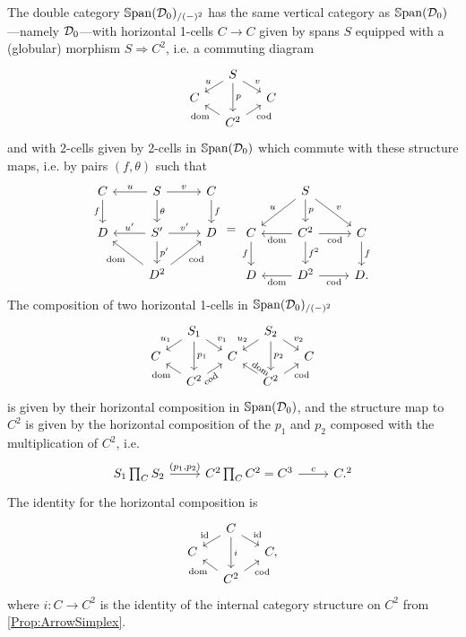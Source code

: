 The double category $\mathbb{S}\mathrm{pan}(\mathcal{D}_0)_{/(-)^2}$ has the same vertical category as $\mathbb{S}\mathrm{pan}(\mathcal{D}_0)$---namely $\mathcal{D}_0$---with horizontal 1-cells $C\to C$ given by spans $S$ equipped with a (globular) morphism $S\Rightarrow C^2$, i.e. a commuting diagram
\[
\begin{tikzcd}[row sep=tiny,column sep=small]
	{} & S \dlar[swap]{u} \drar{v} \ar{dd}{p} & \\
	C && C \\
	& C^2 \ular{\dom} \urar[swap]{\cod}
\end{tikzcd}
\]
and with 2-cells given by 2-cells in $\mathbb{S}\mathrm{pan}(\mathcal{D}_0)$ which commute with these structure maps, i.e. by pairs $(f,\theta)$ such that
\[
\begin{tikzcd}
	C \dar[swap]{f} & S \lar[swap]{u} \rar{v} \dar{\theta} & C \dar{f} \\
	D & S' \lar[swap]{u'} \rar{v'} \dar{p'} & D \\[0em]
	& D^2 \ular{\dom} \urar[swap]{\cod} &
\end{tikzcd}
=
\begin{tikzcd}
	{} & S \dlar[swap]{u} \drar{v} \dar{p} & \\[0em]
	C \dar[swap]{f} & C^2 \lar{\dom} \rar[swap]{\cod} \dar{f^2} & C \dar{f} \\
	D & D^2 \lar{\dom} \rar[swap]{\cod} & D.
\end{tikzcd}
\]
The composition of two horizontal 1-cells in $\mathbb{S}\mathrm{pan}(\mathcal{D}_0)_{/(-)^2}$
\[
\begin{tikzcd}[row sep=tiny,column sep=small]
	{} & S_1 \dlar[swap]{u_1} \drar{v_1} \ar{dd}{p_1} && S_2 \dlar[swap]{u_2} \drar{v_2} \ar{dd}{p_2} \\
	C && C && C \\
	& C^2 \ular{\dom} \urar[swap][sloped,pos=0]{\cod} && C^2 \ular[sloped,pos=0]{\dom} \urar[swap]{\cod}
\end{tikzcd}
\]
is given by their horizontal composition in $\mathbb{S}\mathrm{pan}(\mathcal{D}_0)$, and the structure map to $C^2$ is given by the horizontal composition of the $p_1$ and $p_2$ composed with the multiplication of $C^2$, i.e.
\[
\begin{tikzcd}
	S_1 \prod_C S_2 \rar{(p_1,p_2)} & C^2\prod_C C^2 = C^3 \rar{c} & C.^2
\end{tikzcd}
\]
The identity for the horizontal composition is
\[
\begin{tikzcd}[row sep=tiny,column sep=small]
	{} & C \dlar[swap]{\id} \drar{\id} \ar{dd}{i} & \\
	C && C, \\
	& C^2 \ular{\dom} \urar[swap]{\cod}
\end{tikzcd}
\]
where $i\colon C\to C^2$ is the identity of the internal category structure on $C^2$ from \cref{Prop:ArrowSimplex}.

